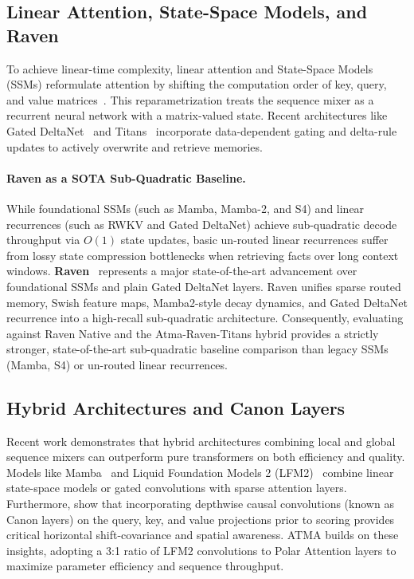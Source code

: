 \documentclass{article} %
\begin{document}
\subsection{Linear Attention, State-Space Models, and Raven}
To achieve linear-time complexity, linear attention and State-Space Models (SSMs) reformulate attention by shifting the computation order of key, query, and value matrices~\citep{mamba2023,deltanet2024}. This reparametrization treats the sequence mixer as a recurrent neural network with a matrix-valued state. Recent architectures like Gated DeltaNet~\citep{deltanet2024} and Titans~\citep{titans2025} incorporate data-dependent gating and delta-rule updates to actively overwrite and retrieve memories.

\paragraph{Raven as a SOTA Sub-Quadratic Baseline.}
While foundational SSMs (such as Mamba, Mamba-2, and S4) and linear recurrences (such as RWKV and Gated DeltaNet) achieve sub-quadratic decode throughput via $O(1)$ state updates, basic un-routed linear recurrences suffer from lossy state compression bottlenecks when retrieving facts over long context windows. \textbf{Raven}~\citep{raven2026} represents a major state-of-the-art advancement over foundational SSMs and plain Gated DeltaNet layers. Raven unifies sparse routed memory, Swish feature maps, Mamba2-style decay dynamics, and Gated DeltaNet recurrence into a high-recall sub-quadratic architecture. Consequently, evaluating against Raven Native and the Atma-Raven-Titans hybrid provides a strictly stronger, state-of-the-art sub-quadratic baseline comparison than legacy SSMs (Mamba, S4) or un-routed linear recurrences.

\subsection{Hybrid Architectures and Canon Layers}
Recent work demonstrates that hybrid architectures combining local and global sequence mixers can outperform pure transformers on both efficiency and quality. Models like Mamba~\citep{mamba2023} and Liquid Foundation Models 2 (LFM2)~\citep{lfm2_2025} combine linear state-space models or gated convolutions with sparse attention layers. Furthermore, \citet{physics_lms_2025} show that incorporating depthwise causal convolutions (known as Canon layers) on the query, key, and value projections prior to scoring provides critical horizontal shift-covariance and spatial awareness. ATMA builds on these insights, adopting a 3:1 ratio of LFM2 convolutions to Polar Attention layers to maximize parameter efficiency and sequence throughput.
\end{document}
